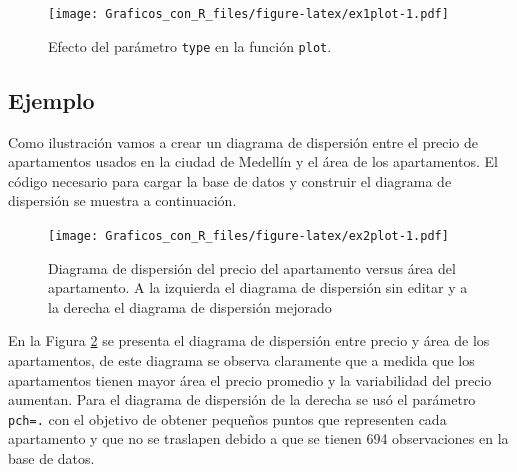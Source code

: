 \documentclass[10pt,]{krantz}
\makeatletter
\newenvironment{Shaded}{\begin{snugshade}}{\end{snugshade}}
\newcommand{\KeywordTok}[1]{\textcolor[rgb]{0.13,0.29,0.53}{\textbf{{#1}}}}
\newcommand{\DataTypeTok}[1]{\textcolor[rgb]{0.13,0.29,0.53}{{#1}}}
\newcommand{\DecValTok}[1]{\textcolor[rgb]{0.00,0.00,0.81}{{#1}}}
\newcommand{\StringTok}[1]{\textcolor[rgb]{0.31,0.60,0.02}{{#1}}}
\newcommand{\NormalTok}[1]{{#1}}
\newenvironment{kframe}{%
\medskip{}
\setlength{\fboxsep}{.8em}
 \def\at@end@of@kframe{}%
 \ifinner\ifhmode%
  \def\at@end@of@kframe{\end{minipage}}%
  \begin{minipage}{\columnwidth}%
 \fi\fi%
 \def\FrameCommand##1{\hskip\@totalleftmargin \hskip-\fboxsep
 \colorbox{shadecolor}{##1}\hskip-\fboxsep
     \hskip-\linewidth \hskip-\@totalleftmargin \hskip\columnwidth}%
 \MakeFramed {\advance\hsize-\width
   \@totalleftmargin\z@ \linewidth\hsize
   \@setminipage}}%
 {\par\unskip\endMakeFramed%
 \at@end@of@kframe}
\renewenvironment{Shaded}{\begin{kframe}}{\end{kframe}}
\makeatother
\begin{document}
\begin{figure}[htbp]
\centering
\texttt{[image: Graficos\_con\_R\_files/figure-latex/ex1plot-1.pdf]}
\caption{\label{fig:ex1plot}Efecto del parámetro \texttt{type} en la función
\texttt{plot}.}
\end{figure}

\subsection*{Ejemplo}\label{ejemplo-9}


Como ilustración vamos a crear un diagrama de dispersión entre el precio
de apartamentos usados en la ciudad de Medellín y el área de los
apartamentos. El código necesario para cargar la base de datos y
construir el diagrama de dispersión se muestra a continuación.

\begin{Shaded}
\end{Shaded}

\begin{figure}[htbp]
\centering
\texttt{[image: Graficos\_con\_R\_files/figure-latex/ex2plot-1.pdf]}
\caption{\label{fig:ex2plot}Diagrama de dispersión del precio del
apartamento versus área del apartamento. A la izquierda el diagrama de
dispersión sin editar y a la derecha el diagrama de dispersión mejorado}
\end{figure}

En la Figura \ref{fig:ex2plot} se presenta el diagrama de dispersión
entre precio y área de los apartamentos, de este diagrama se observa
claramente que a medida que los apartamentos tienen mayor área el precio
promedio y la variabilidad del precio aumentan. Para el diagrama de
dispersión de la derecha se usó el parámetro
\texttt{pch=\textquotesingle{}.\textquotesingle{}} con el objetivo de
obtener pequeños puntos que representen cada apartamento y que no se
traslapen debido a que se tienen 694 observaciones en la base de datos.
\end{document}
